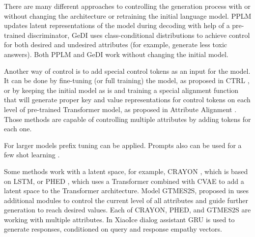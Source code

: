 \documentclass[11pt]{article}
\begin{document}
There are many different approaches to controlling the generation process with or without changing the architecture or retraining the initial language model. PPLM \cite{pplm} updates latent representations of the model during decoding with help of a pre-trained discriminator, GeDI \cite{gedi} uses class-conditional distributions to achieve control for both desired and undesired attributes (for example, generate less toxic answers). Both PPLM and GeDI work without changing the initial model. 

Another way of control is to add special control tokens as an input for the model. It can be done by fine-tuning (or full training) the model, as proposed in CTRL \cite{ctrl}, or by keeping the initial model as is and training a special alignment function that will generate proper key and value representations for control tokens on each level of pre-trained Transformer model, as proposed in Attribute Alignment \cite{attr_alignment}. Those methods are capable of controlling multiple attributes by adding tokens for each one.

For larger models prefix tuning \cite{prefix_tuning} can be applied. Prompts also can be used for a few shot learning \cite{prompt_based_few_shot}.

Some methods work with a latent space, for example, CRAYON \cite{hu2021controllable}, which is based on LSTM, or PHED \cite{phed}, which uses a Transformer combined with CVAE to add a latent space to the Transformer architecture. Model GTMES2S, proposed in \cite{neural_meta_words} uses additional modules to control the current level of all attributes and guide further generation to reach desired values. Each of CRAYON, PHED, and GTMES2S are working with multiple attributes. In XiaoIce dialog assistant \cite{zhou2019design} GRU is used to generate responses, conditioned on query and response empathy vectors.
\end{document}
